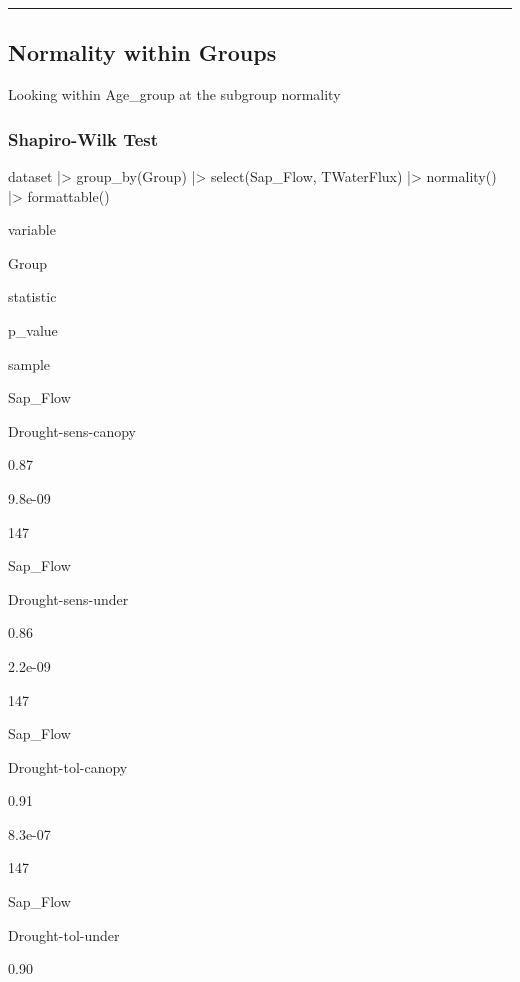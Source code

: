 \documentclass[
  letterpaper,
  DIV=11,
  numbers=noendperiod]{scrreprt}
\newenvironment{Shaded}{\begin{snugshade}}{\end{snugshade}}
\newcommand{\FunctionTok}[1]{\textcolor[rgb]{0.28,0.35,0.67}{#1}}
\newcommand{\NormalTok}[1]{\textcolor[rgb]{0.00,0.23,0.31}{#1}}
\newcommand{\SpecialCharTok}[1]{\textcolor[rgb]{0.37,0.37,0.37}{#1}}
\begin{document}
\begin{center}\rule{0.5\linewidth}{0.5pt}\end{center}

\hypertarget{normality-within-groups}{%
\subsection{Normality within Groups}\label{normality-within-groups}}

Looking within Age\_group at the subgroup normality

\hypertarget{shapiro-wilk-test-1}{%
\subsubsection{Shapiro-Wilk Test}\label{shapiro-wilk-test-1}}

\begin{Shaded}
\begin{Highlighting}[]
\NormalTok{dataset }\SpecialCharTok{|\textgreater{}}
  \FunctionTok{group\_by}\NormalTok{(Group) }\SpecialCharTok{|\textgreater{}}
  \FunctionTok{select}\NormalTok{(Sap\_Flow, TWaterFlux) }\SpecialCharTok{|\textgreater{}}
  \FunctionTok{normality}\NormalTok{() }\SpecialCharTok{|\textgreater{}}
  \FunctionTok{formattable}\NormalTok{()}
\end{Highlighting}
\end{Shaded}

variable

Group

statistic

p\_value

sample

Sap\_Flow

Drought-sens-canopy

0.87

9.8e-09

147

Sap\_Flow

Drought-sens-under

0.86

2.2e-09

147

Sap\_Flow

Drought-tol-canopy

0.91

8.3e-07

147

Sap\_Flow

Drought-tol-under

0.90
\end{document}
